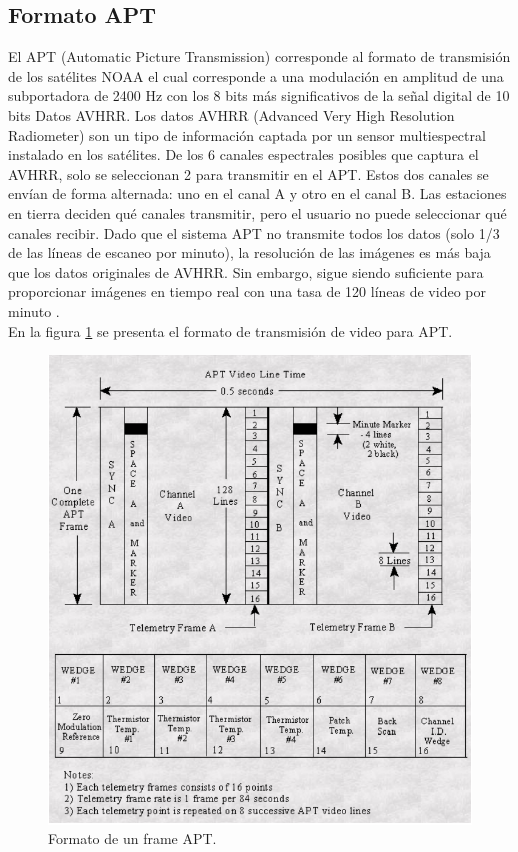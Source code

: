 \subsection{Formato APT}
El APT (Automatic Picture Transmission) corresponde al formato de transmisión de los satélites NOAA el cual corresponde a una modulación en amplitud de una subportadora de 2400 Hz con los 8 bits más significativos de la señal digital de 10 bits
Datos AVHRR. Los datos AVHRR (Advanced Very High Resolution Radiometer) son un tipo de información captada por un sensor multiespectral instalado en los satélites. De los 6 canales espectrales posibles que captura el AVHRR, solo se seleccionan 2 para transmitir en el APT. Estos dos canales se envían de forma alternada: uno en el canal A y otro en el canal B. Las estaciones en tierra deciden qué canales transmitir, pero el usuario no puede seleccionar qué canales recibir. Dado que el sistema APT no transmite todos los datos (solo 1/3 de las líneas de escaneo por minuto), la resolución de las imágenes es más baja que los datos originales de AVHRR. Sin embargo, sigue siendo suficiente para proporcionar imágenes en tiempo real con una tasa de 120 líneas de video por minuto \cite{noaaReceiveStations}.\\

En la figura \ref{fig:apt} se presenta el formato de transmisión de video para APT.

\begin{figure}[h!]
    \centering
    \includegraphics[width=0.7\linewidth]{img/apt.png}
    \caption{Formato de un frame APT.}
    \label{fig:apt}
\end{figure}

